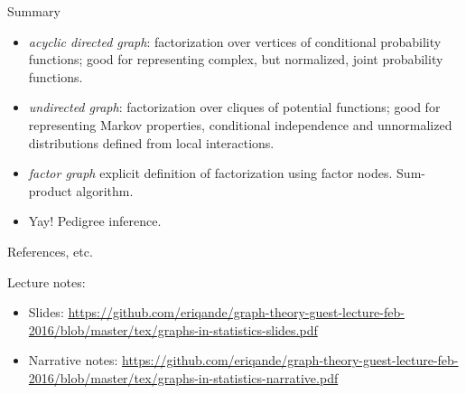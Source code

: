 \documentclass[letter,graphicx]{beamer}
\begin{document}
\begin{frame}{Summary}
\begin{itemize}
\item {\em acyclic directed graph}: factorization over vertices of conditional probability functions; good for representing complex, but
normalized, joint probability functions. 
\item {\em undirected graph}: factorization over cliques of potential functions; good for representing Markov properties, conditional independence and unnormalized distributions defined from local interactions.
\item {\em factor graph} explicit definition of factorization using factor nodes.  Sum-product algorithm.  
\item Yay! Pedigree inference. 
\end{itemize}
\end{frame}

\begin{frame}{References, etc.}
\tiny

Lecture notes:
\begin{itemize}
\item Slides:  \url{https://github.com/eriqande/graph-theory-guest-lecture-feb-2016/blob/master/tex/graphs-in-statistics-slides.pdf}
\item Narrative notes: \url{https://github.com/eriqande/graph-theory-guest-lecture-feb-2016/blob/master/tex/graphs-in-statistics-narrative.pdf}
\end{itemize}



\end{frame}
\end{document}
